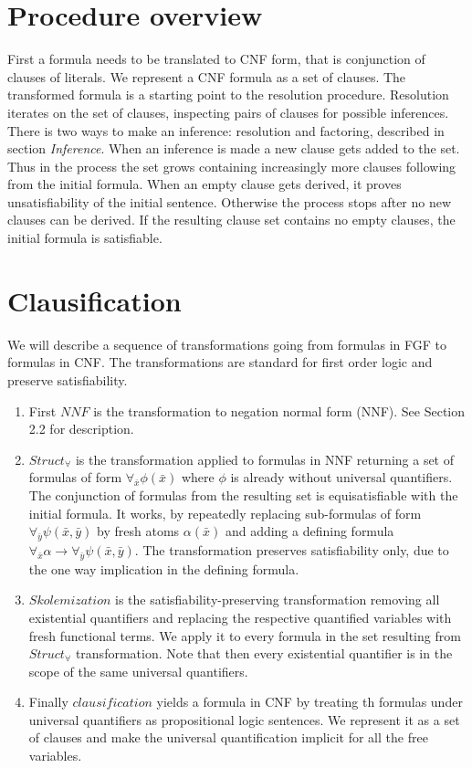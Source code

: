 \documentclass[english, shortabstract]{iithesis}
\theoremstyle{definition} \newtheorem{definition}{Definition}[chapter]
\theoremstyle{remark} \newtheorem{remark}[definition]{Observation}
\theoremstyle{plain} \newtheorem{theorem}[definition]{Theorem}
\theoremstyle{plain} \newtheorem{lemma}[definition]{Lemma}
\begin{document}
\section{Procedure overview}

First a formula needs to be translated to CNF form, that is conjunction of clauses of literals. 
We represent a CNF formula as a set of clauses. The transformed formula is a starting point to the resolution procedure.
Resolution iterates on the set of clauses, inspecting pairs of clauses for possible inferences.
There is two ways to make an inference: resolution and factoring, described in section \textit{Inference}.
When an inference is made a new clause gets added to the set.
Thus in the process the set grows containing increasingly more clauses following from the initial formula.
When an empty clause gets derived, it proves unsatisfiability of the initial sentence.
Otherwise the process stops after no new clauses can be derived. If the resulting 
clause set contains no empty clauses, the initial formula is satisfiable.

\section{Clausification}

We will describe a sequence of transformations going from formulas in FGF to formulas in CNF.
The transformations are standard for first order logic and preserve satisfiability.
\begin{enumerate}
    \item First $NNF$ is the transformation to negation normal form (NNF). See \cite{resolution book} Section 2.2 for description.
    \item $Struct_{\forall}$ is the transformation applied to formulas in NNF returning a set of formulas of form $\forall_{\bar{x}}\phi(\bar{x})$ where $\phi$ is already without universal quantifiers. The conjunction of formulas from the resulting set is equisatisfiable with the initial formula.
    It works, by repeatedly replacing sub-formulas of form $\forall_{\bar{y}} \psi(\bar{x},\bar{y})$ 
    by fresh atoms $\alpha(\bar{x})$ and adding a defining formula $\forall_{\bar{x}} \alpha \rightarrow \forall_{\bar{y}} \psi(\bar{x},\bar{y})$.
    The transformation preserves satisfiability only, due to the one way implication in the defining formula.
    \item $Skolemization$ is the satisfiability-preserving transformation removing all existential quantifiers and replacing the respective quantified variables with fresh functional terms.
    We apply it to every formula in the set resulting from $Struct_\forall$ transformation.
    Note that then every existential quantifier is in the scope of the same universal quantifiers.
    \item Finally $clausification$ yields a formula in CNF by treating th formulas under universal quantifiers as propositional logic sentences. We represent it as a set of clauses and make the universal quantification implicit for all the free variables. 
\end{enumerate}
\end{document}
